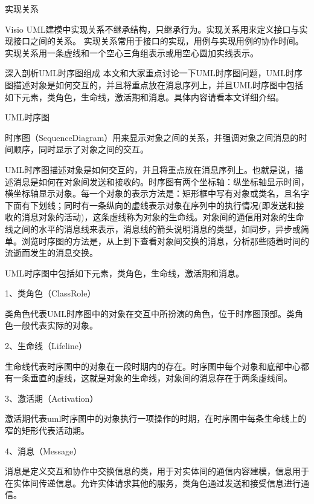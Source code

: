 \documentclass[a4paper,11pt]{book}
\begin{document}
实现关系

Visio  UML建模中实现关系不继承结构，只继承行为。实现关系用来定义接口与实现接口之间的关系。
实现关系常用于接口的实现，用例与实现用例的协作时间。实现关系用一条虚线和一个空心三角组表示或用空心圆加实线表示。


















深入剖析UML时序图组成
本文和大家重点讨论一下UML时序图问题，UML时序图描述对象是如何交互的，并且将重点放在消息序列上，并且UML时序图中包括如下元素，类角色，生命线，激活期和消息。具体内容请看本文详细介绍。

UML时序图

时序图（SequenceDiagram）用来显示对象之间的关系，并强调对象之间消息的时间顺序，同时显示了对象之间的交互。

UML时序图描述对象是如何交互的，并且将重点放在消息序列上。也就是说，描述消息是如何在对象间发送和接收的。时序图有两个坐标轴：纵坐标轴显示时间，横坐标轴显示对象。每一个对象的表示方法是：矩形框中写有对象或类名，且名字下面有下划线；同时有一条纵向的虚线表示对象在序列中的执行情况(即发送和接收的消息对象的活动)，这条虚线称为对象的生命线。对象间的通信用对象的生命线之间的水平的消息线来表示，消息线的箭头说明消息的类型，如同步，异步或简单。浏览时序图的方法是，从上到下查看对象间交换的消息，分析那些随着时间的流逝而发生的消息交换。

UML时序图中包括如下元素，类角色，生命线，激活期和消息。

1、类角色（ClassRole）

类角色代表UML时序图中的对象在交互中所扮演的角色，位于时序图顶部。类角色一般代表实际的对象。

2、生命线（Lifeline）

生命线代表时序图中的对象在一段时期内的存在。时序图中每个对象和底部中心都有一条垂直的虚线，这就是对象的生命线，对象间的消息存在于两条虚线间。

3、激活期（Activation）

激活期代表uml时序图中的对象执行一项操作的时期，在时序图中每条生命线上的窄的矩形代表活动期。

4、消息（Message）

消息是定义交互和协作中交换信息的类，用于对实体间的通信内容建模，信息用于在实体间传递信息。允许实体请求其他的服务，类角色通过发送和接受信息进行通信。
\end{document}
